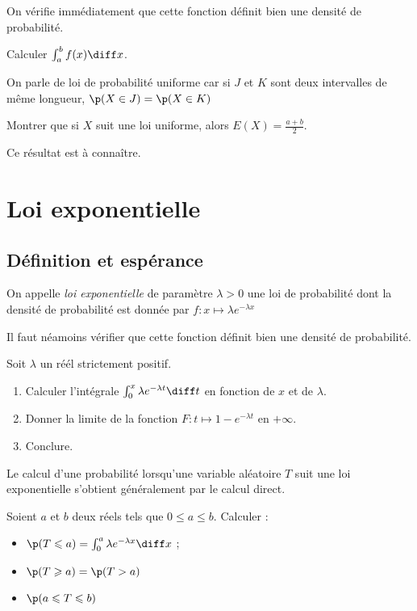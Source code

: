 \documentclass[11pt,a4paper,french]{article}
\begin{document}
On vérifie immédiatement que cette fonction définit bien une densité de
probabilité.

\begin{exercice}
  Calculer $\int_a^b f(x) \diff x$.
\end{exercice}

On parle de loi de probabilité uniforme car si $J$ et $K$ sont deux
intervalles de même longueur, $\p(X\in J) = \p(X \in K)$

\begin{exercice}
  Montrer que si $X$ suit une loi uniforme, alors $E(X) = \frac{a+b}2$.
\end{exercice}

Ce résultat est à connaître.

\pagebreak

\section{Loi exponentielle}

\subsection{Définition et espérance}

\begin{definition}
  On appelle \emph{loi exponentielle} de paramètre $\lambda>0$ une loi
  de probabilité dont la densité de probabilité est donnée par
  $f:x\mapsto \lambda e^{-\lambda x}$
\end{definition}

Il faut néamoins vérifier que cette fonction définit bien une densité de
probabilité.

\begin{exercice}
  Soit $\lambda$ un réél strictement positif.
  \begin{enumerate}
    \item Calculer l'intégrale $\int_0^x \lambda e^{-\lambda t} \diff t$
      en fonction de $x$ et de $\lambda$.
    \item Donner la limite de la fonction $F:t \mapsto 1 - e^{-\lambda
      t}$ en $+\infty$.
    \item Conclure.
  \end{enumerate}
\end{exercice}

Le calcul d'une probabilité lorsqu'une variable aléatoire $T$ suit une
loi exponentielle s'obtient généralement par le calcul direct.

\begin{exercice}
  Soient $a$ et $b$ deux réels tels que $0\leqslant a \leqslant b$.
  Calculer :
  \begin{itemize}
    \item $\p(T \leqslant a) = \int_0^a \lambda e^{-\lambda x} \diff x$ ;
    \item $\p(T \geqslant a) = \p(T > a )$
    \item $\p(a \leqslant T \leqslant b)$
  \end{itemize}
\end{exercice}
\end{document}
